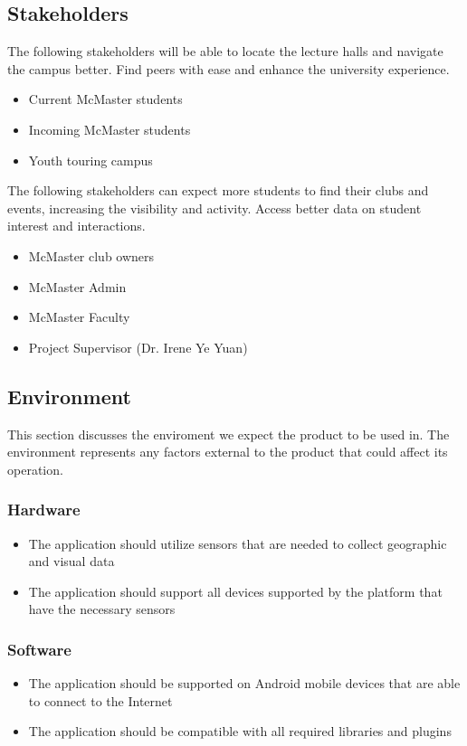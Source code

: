 \documentclass{article}
\begin{document}
\subsection{Stakeholders}

\quad The following stakeholders will be able to locate the lecture halls and navigate the campus better. Find peers with ease and enhance the university experience.

\begin{itemize}
    \item Current McMaster students
    \item Incoming McMaster students    
    \item Youth touring campus
\end{itemize}
    \quad The following stakeholders can expect more students to find their clubs and events, increasing the visibility and activity. Access better data on student interest and interactions. 
\begin{itemize}
    \item McMaster club owners
    \item McMaster Admin
    \item McMaster Faculty
    \item Project Supervisor (Dr. Irene Ye Yuan)
\end{itemize}

\subsection{Environment}

This section discusses the enviroment we expect the product to be used in. The environment represents any factors external to the product that could affect its operation.

\subsubsection{Hardware}
\begin{itemize}
    \item The application should utilize sensors that are needed to collect geographic and visual data
    \item The application should support all devices supported by the platform that have the necessary sensors
\end{itemize}

\subsubsection{Software}
\begin{itemize}
    \item The application should be supported on Android mobile devices that are able to connect to the Internet
    \item The application should be compatible with all required libraries and plugins
\end{itemize}
\end{document}
